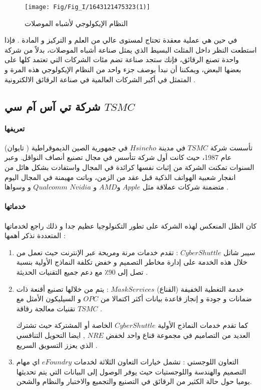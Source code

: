 \begin{figure}[h!]
	\centering
	\texttt{[image: Fig/Fig\_I/1643121475323(1)]}
	\caption{النظام الإيكولوجي لأشباه الموصلات }
	\label{fig:16431214753231}
\end{figure}


في حين هي عملية معقدة تحتاج لمستوى عالي من العلم و التركيز و المادة . فإذا استطعت النظر داخل المثلث البسيط الذي يمثل صناعة أشباه الموصلات، بدلاً من شركة واحدة تصنع الرقائق، فإنك ستجد صناعة تضم مئات الشركات التي تعتمد كلها على بعضها البعض، ويمكننا أن نبدأ بوصف جزء واحد من النظام الإيكولوجي هذه المرة و المتمثل في أكبر الشركات العالمية في صناعة الرقائق الالكترونية  .
\subsection{ شركة تي آس آم سي $ TSMC $  }
\paragraph{تعريفها}
تأسست شركة $ TSMC $ في مدينة $ Hsincho $ في جمهورية الصين الديموقراطية ( تايوان) عام 1987، حيث كانت أول شركة تتأسس في مجال تصنيع أنصاف النواقل. وعبر السنوات تمكنت الشركة من إثبات نفسها كرائدة في المجال  واستفادت بشكل هائل من انفجار شعبية الهواتف الذكية قبل عقد من الزمن، وباتت مهيمنة في المجال اليوم متضمنة شركات عملاقة مثل $ Apple $ و$ AMD $ و $ Nvidia  $ $ Qualcomm $ و  وسواها . \cite{a7}
\paragraph{خدماتها} 
كان الظل المنعكس لهذه الشركة على تطور التكنولوجيا عظيم جدا و ذلك راجع لخدماتها المتعددة نذكر أهمها :
\begin{enumerate}
	\item 
	سيبر شاتل $ CyberShuttle $ :
	تقدم خدمات مرنة ومريحة عبر الإنترنت حيث تعمل من خلال هذه الخدمة على إدارة مخاطر التصميم و 	خفض تكلفة النماذج الأولية بنسبة تصل إلى 90٪ مع 	دعم جميع التقنيات الحديثة .
	
	\item 
	خدمة التغطية الخفيفة  (القناع)   $ Mask Services $ :
	يتم من خلالها تصنيع أقنعة ذات ضمانات و جودة و إنجاز قاعدة بيانات أكثر اكتمالا من $ OPC $ و السيليكون الأمثل مع تقنيات معالجة رقاقة $ TSMC $ . 
	
	كما تقدم خدمات النماذج الأولية $ CyberShuttle $ الخاصة أو المشتركة حيث تشترك العديد من التصاميم في مجموعة قناع واحد لخفض $ NRE $ , ايضا التحويل التنافسي الذي يعزز التسويق السريع .
	
	\item
	التعاون اللوجستي :  تشمل خيارات التعاون الثلاثة لخدمات $ eFoundry $ اي مهام التصميم والهندسة واللوجستيات حيث يوفر الوصول إلى البيانات التي يتم تحديثها يوميا حول حالة الكثير من الرقائق في التصنيع والتجميع والاختبار والنظام والشحن. \cite{a7}
	
\end{enumerate}


